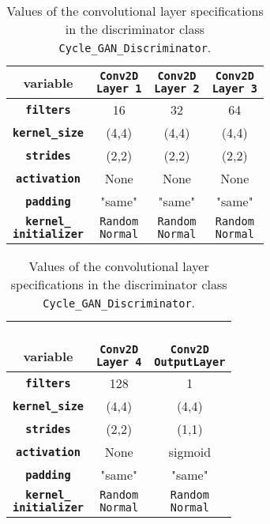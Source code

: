 \documentclass[fleqn,10pt]{SelfArx} %
\begin{document}
\begin{table}[htb]
\centering
\caption{Values of the convolutional layer specifications in the discriminator class \texttt{Cycle\_GAN\_Discriminator}\cite{image-to-image-ccan}.}
\label{tab:discriminatorValues}
\begin{tabular}{c c c c}
\textbf{variable} & \makecell[cc]{\textbf{\texttt{Conv2D}} \\ \textbf{\texttt{Layer 1}}} & \makecell[cc]{\textbf{\texttt{Conv2D}} \\ \textbf{\texttt{Layer 2}}} & \makecell[cc]{\textbf{\texttt{Conv2D}} \\ \textbf{\texttt{Layer 3}}} \\ \hline
\textbf{\texttt{filters}} & 16 & 32 & 64 \\ \hline
\textbf{\texttt{kernel\_size}} & (4,4) & (4,4) & (4,4) \\ \hline
\textbf{\texttt{strides}} & (2,2) & (2,2) & (2,2) \\ \hline
\textbf{\texttt{activation}} & None & None & None\\ \hline 
\textbf{\texttt{padding}} & "same" & "same" & "same" \\ \hline
\makecell[cc]{\textbf{\texttt{kernel\_}} \\ \textbf{\texttt{initializer}}} & \makecell[cc]{\texttt{Random} \\ \texttt{Normal}} & \makecell[cc]{\texttt{Random} \\ \texttt{Normal}} & \makecell[cc]{\texttt{Random} \\ \texttt{Normal}} \\ \hline
\end{tabular}

\begin{tabular}{c c c}
\makecell[cc]{\\ \textbf{variable}} & \makecell[cc]{\\ \textbf{\texttt{Conv2D}} \\ \textbf{\texttt{Layer 4}}} & \makecell[cc]{\\ \textbf{\texttt{Conv2D}} \\ \textbf{\texttt{OutputLayer}}} \\ \hline
\textbf{\texttt{filters}} & 128 & 1 \\ \hline
\textbf{\texttt{kernel\_size}} & (4,4) & (4,4) \\ \hline
\textbf{\texttt{strides}} & (2,2) & (1,1) \\ \hline
\textbf{\texttt{activation}} & None & sigmoid \\ \hline 
\textbf{\texttt{padding}} & "same" & "same" \\ \hline
\makecell[cc]{\textbf{\texttt{kernel\_}} \\ \textbf{\texttt{initializer}}} & \makecell[cc]{\texttt{Random} \\ \texttt{Normal}} & \makecell[cc]{\texttt{Random} \\ \texttt{Normal}} \\ \hline
\end{tabular}
\end{table}
\end{document}

